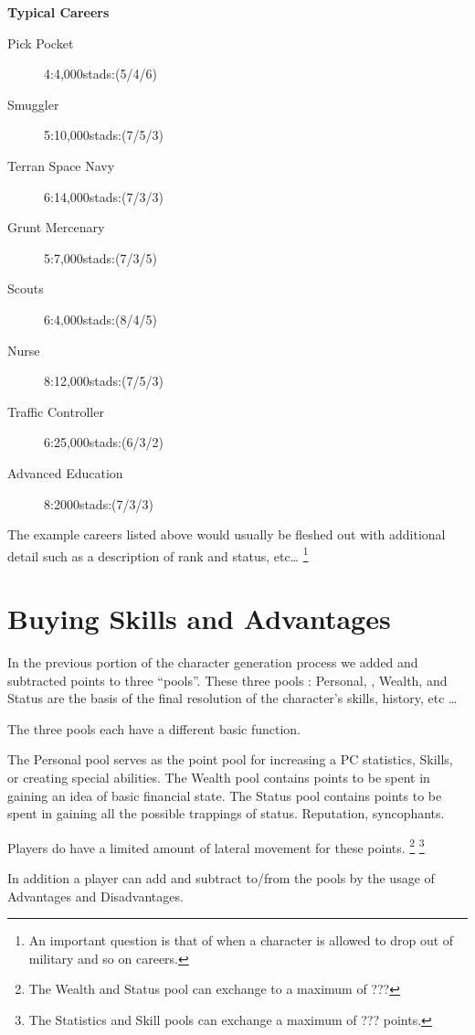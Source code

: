 {\bf Typical Careers}
	\begin{description}
		\item[Pick Pocket]
        4:4,000stads:(5/4/6)
		\item[Smuggler]
        5:10,000stads:(7/5/3)
		\item[Terran Space Navy]
        6:14,000stads:(7/3/3)
		\item[Grunt Mercenary]
        5:7,000stads:(7/3/5)
		\item[Scouts]
        6:4,000stads:(8/4/5)
		\item[Nurse]
        8:12,000stads:(7/5/3)
		\item[Traffic Controller]
        6:25,000stads:(6/3/2)
		\item[Advanced Education]
        8:2000stads:(7/3/3)
	\end{description}

The example careers listed above would usually be fleshed out with
additional detail such as a description of rank and status, etc\dots
\footnote{An important question is that of when a character is
allowed to drop out of military and so on careers.}

\section{Buying Skills and Advantages}

In the previous portion of the character generation process we added
and subtracted points to three ``pools''. These three pools : Personal,
, Wealth, and Status are the basis of the final resolution of
the character's skills, history, etc \dots

The three pools each have a different basic function.

The Personal pool serves as the point pool for
increasing a PC statistics, Skills,  or creating special abilities.
The Wealth pool contains points to be spent in gaining an idea of
basic financial state.
The Status pool contains points to be spent in gaining all the
possible trappings of status. Reputation, syncophants.

Players do have a limited amount of lateral movement for these
points. \footnote{The Wealth and Status pool can exchange to a maximum of ???}
\footnote{The Statistics and Skill pools can exchange a maximum of ??? points.}

In addition a player can add and subtract to/from the pools by the
usage of Advantages and Disadvantages.

